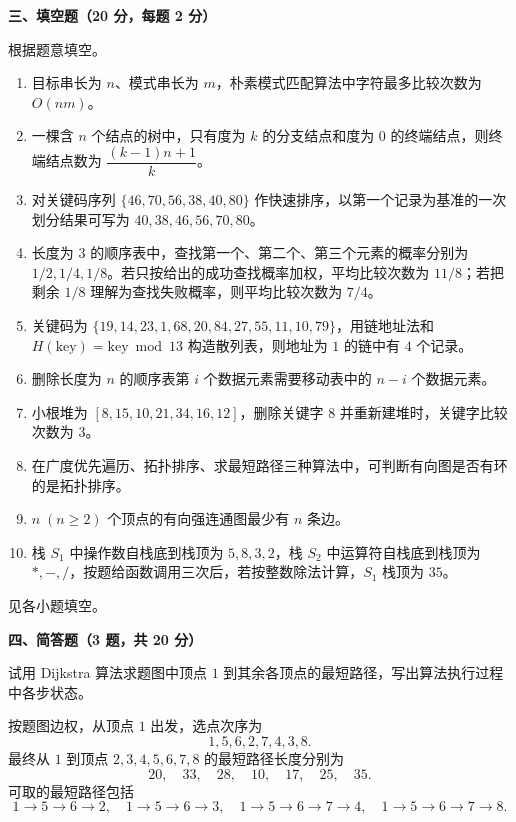 \textbf{三、填空题（20 分，每题 2 分）}
\begin{question}
根据题意填空。
\begin{enumerate}
  \item 目标串长为 $n$、模式串长为 $m$，朴素模式匹配算法中字符最多比较次数为 $O(nm)$。
  \item 一棵含 $n$ 个结点的树中，只有度为 $k$ 的分支结点和度为 $0$ 的终端结点，则终端结点数为 $\dfrac{(k-1)n+1}{k}$。
  \item 对关键码序列 $\{46,70,56,38,40,80\}$ 作快速排序，以第一个记录为基准的一次划分结果可写为 $40,38,46,56,70,80$。
  \item 长度为 $3$ 的顺序表中，查找第一个、第二个、第三个元素的概率分别为 $1/2,1/4,1/8$。若只按给出的成功查找概率加权，平均比较次数为 $11/8$；若把剩余 $1/8$ 理解为查找失败概率，则平均比较次数为 $7/4$。
  \item 关键码为 $\{19,14,23,1,68,20,84,27,55,11,10,79\}$，用链地址法和 $H(\mathrm{key})=\mathrm{key}\bmod 13$ 构造散列表，则地址为 $1$ 的链中有 $4$ 个记录。
  \item 删除长度为 $n$ 的顺序表第 $i$ 个数据元素需要移动表中的 $n-i$ 个数据元素。
  \item 小根堆为 $[8,15,10,21,34,16,12]$，删除关键字 $8$ 并重新建堆时，关键字比较次数为 $3$。
  \item 在广度优先遍历、拓扑排序、求最短路径三种算法中，可判断有向图是否有环的是拓扑排序。
  \item $n\;(n\ge2)$ 个顶点的有向强连通图最少有 $n$ 条边。
  \item 栈 $S_1$ 中操作数自栈底到栈顶为 $5,8,3,2$，栈 $S_2$ 中运算符自栈底到栈顶为 $*, -, /$，按题给函数调用三次后，若按整数除法计算，$S_1$ 栈顶为 $35$。
\end{enumerate}
\begin{solution}
见各小题填空。
\end{solution}
\end{question}

\textbf{四、简答题（3 题，共 20 分）}
\begin{question}[Dijkstra 算法]
试用 Dijkstra 算法求题图中顶点 $1$ 到其余各顶点的最短路径，写出算法执行过程中各步状态。

\begin{solution}
按题图边权，从顶点 $1$ 出发，选点次序为
\[
1,5,6,2,7,4,3,8.
\]
最终从 $1$ 到顶点 $2,3,4,5,6,7,8$ 的最短路径长度分别为
\[
20,\quad 33,\quad 28,\quad 10,\quad 17,\quad 25,\quad 35.
\]
可取的最短路径包括
\[
1\to5\to6\to2,
\quad 1\to5\to6\to3,
\quad 1\to5\to6\to7\to4,
\quad 1\to5\to6\to7\to8.
\]
\end{solution}
\end{question}

